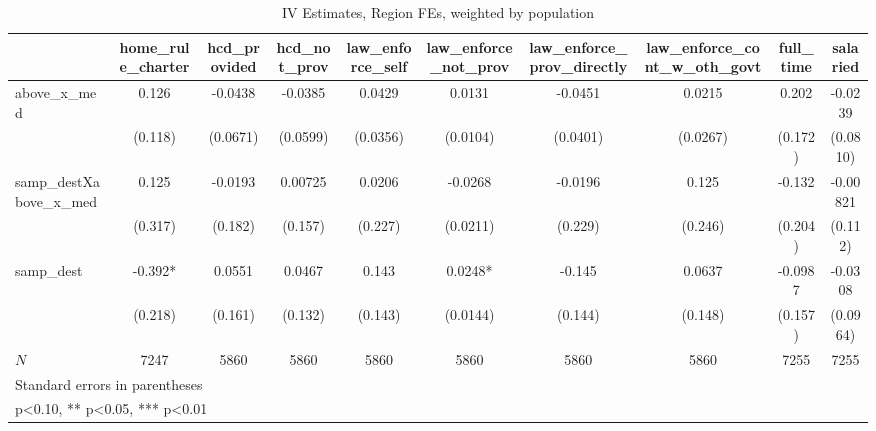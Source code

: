\begin{table}[htbp]\centering
\def\sym#1{\ifmmode^{#1}\else\(^{#1}\)\fi}
\caption{IV Estimates, Region FEs, weighted by population}
\begin{tabular}{l*{9}{c}}
\toprule
            &\multicolumn{1}{c}{home\_rule\_charter}&\multicolumn{1}{c}{hcd\_provided}&\multicolumn{1}{c}{hcd\_not\_prov}&\multicolumn{1}{c}{law\_enforce\_self}&\multicolumn{1}{c}{law\_enforce\_not\_prov}&\multicolumn{1}{c}{law\_enforce\_prov\_directly}&\multicolumn{1}{c}{law\_enforce\_cont\_w\_oth\_govt}&\multicolumn{1}{c}{full\_time}&\multicolumn{1}{c}{salaried}\\
\midrule
above\_x\_med &       0.126   &     -0.0438   &     -0.0385   &      0.0429   &      0.0131   &     -0.0451   &      0.0215   &       0.202   &     -0.0239   \\
            &     (0.118)   &    (0.0671)   &    (0.0599)   &    (0.0356)   &    (0.0104)   &    (0.0401)   &    (0.0267)   &     (0.172)   &    (0.0810)   \\
\addlinespace
samp\_destXabove\_x\_med&       0.125   &     -0.0193   &     0.00725   &      0.0206   &     -0.0268   &     -0.0196   &       0.125   &      -0.132   &    -0.00821   \\
            &     (0.317)   &     (0.182)   &     (0.157)   &     (0.227)   &    (0.0211)   &     (0.229)   &     (0.246)   &     (0.204)   &     (0.112)   \\
\addlinespace
samp\_dest   &      -0.392*  &      0.0551   &      0.0467   &       0.143   &      0.0248*  &      -0.145   &      0.0637   &     -0.0987   &     -0.0308   \\
            &     (0.218)   &     (0.161)   &     (0.132)   &     (0.143)   &    (0.0144)   &     (0.144)   &     (0.148)   &     (0.157)   &    (0.0964)   \\
\midrule
\(N\)       &        7247   &        5860   &        5860   &        5860   &        5860   &        5860   &        5860   &        7255   &        7255   \\
\bottomrule
\multicolumn{10}{l}{\footnotesize Standard errors in parentheses}\\
\multicolumn{10}{l}{\footnotesize * p<0.10, ** p<0.05, *** p<0.01}\\
\end{tabular}
\end{table}

